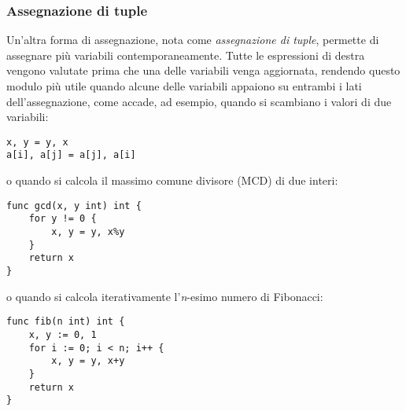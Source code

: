 \documentclass[../../../thesis.tex]{subfiles}
\begin{document}
    \subsubsection{Assegnazione di tuple}
    Un'altra forma di assegnazione, nota come \textit{assegnazione di tuple}, permette di assegnare più variabili contemporaneamente.
    Tutte le espressioni di destra vengono valutate prima che una delle variabili venga aggiornata, rendendo questo modulo più utile quando alcune delle variabili appaiono su entrambi i lati dell'assegnazione, come accade, ad esempio, quando si scambiano i valori di due variabili:
    \begin{lstlisting}[frame = single,label={lst:lstlisting1-4-1.1}]
x, y = y, x
a[i], a[j] = a[j], a[i]
    \end{lstlisting}
    o quando si calcola il massimo comune divisore (MCD) di due interi:
    \begin{lstlisting}[frame = single,label={lst:lstlisting1-4-1.2}]
func gcd(x, y int) int {
    for y != 0 {
        x, y = y, x%y
    }
    return x
}
    \end{lstlisting}
    o quando si calcola iterativamente l'\textit{n}-esimo numero di Fibonacci:
    \begin{lstlisting}[frame = single,label={lst:lstlisting1-4-1.3}]
func fib(n int) int {
    x, y := 0, 1
    for i := 0; i < n; i++ {
        x, y = y, x+y
    }
    return x
}
    \end{lstlisting}
\end{document}
